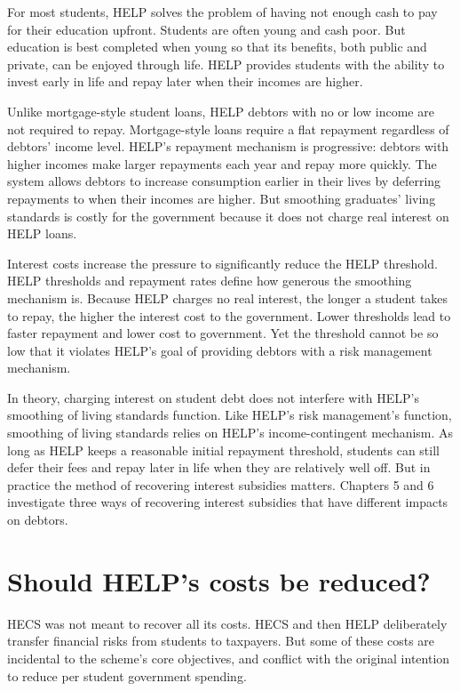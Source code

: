 \documentclass[embargoed]{grattan}
\begin{document}
{For most students, \gls{HELP} solves the problem of having not enough cash to pay for their education upfront.
Students are often young and cash poor.
But education is best completed when young so that its benefits, both public and private, can be enjoyed through life.
\gls{HELP} provides students with the ability to invest early in life and repay later when their incomes are higher.

Unlike mortgage-style student loans, \gls{HELP} debtors with no or low income are not required to repay.
Mortgage-style loans require a flat repayment regardless of debtors' income level.
\gls{HELP}'s repayment mechanism is progressive: debtors with higher incomes make larger repayments each year and repay more quickly.
The system allows debtors to increase consumption earlier in their lives by deferring repayments to when their incomes are higher.
But smoothing graduates' living standards is costly for the government because it does not charge real interest on \gls{HELP} loans.

Interest costs increase the pressure to significantly reduce the \gls{HELP} threshold.
\gls{HELP} thresholds and repayment rates define how generous the smoothing mechanism is.
Because \gls{HELP} charges no real interest, the longer a student takes to repay, the higher the interest cost to the government.
Lower thresholds lead to faster repayment and lower cost to government.
Yet the threshold cannot be so low that it violates \gls{HELP}'s goal of providing debtors with a risk management mechanism.

In theory, charging interest on student debt does not interfere with \gls{HELP}'s smoothing of living standards function.
Like \gls{HELP}'s risk management's function, smoothing of living standards relies on \gls{HELP}'s income-contingent mechanism.
As long as \gls{HELP} keeps a reasonable initial repayment threshold, students can still defer their fees and repay later in life when they are relatively well off. \protect\hypertarget{_Ref435627338}{}{}But in practice the method of recovering interest subsidies matters.
Chapters 5 and 6 investigate three ways of recovering interest subsidies that have different impacts on debtors.

\section[Should {HELP}'s costs be reduced?]{Should \gls{HELP}'s costs be reduced?}\label{should-helps-costs-be-reduced}

\gls{HECS} was not meant to recover all its costs.
\gls{HECS} and then \gls{HELP} deliberately transfer financial risks from students to taxpayers.
But some of these costs are incidental to the scheme's core objectives, and conflict with the original intention to reduce per student government spending.

}
\end{document}
